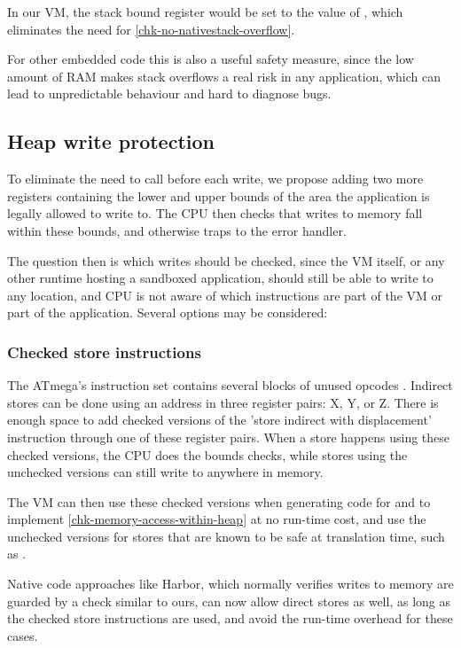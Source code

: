 In our VM, the stack bound register would be set to the value of , which eliminates the need for \ref{chk-no-nativestack-overflow}.

For other embedded code this is also a useful safety measure, since the low amount of RAM makes stack overflows a real risk in any application, which can lead to unpredictable behaviour and hard to diagnose bugs.

\subsection{Heap write protection}
To eliminate the need to call  before each write, we propose adding two more registers containing the lower and upper bounds of the area the application is legally allowed to write to. The CPU then checks that writes to memory fall within these bounds, and otherwise traps to the error handler.

The question then is which writes should be checked, since the VM itself, or any other runtime hosting a sandboxed application, should still be able to write to any location, and CPU is not aware of which instructions are part of the VM or part of the application. Several options may be considered:

\subsubsection{Checked store instructions}
The ATmega's instruction set contains several blocks of unused opcodes \cite{Atmel:AVRInstructionSetManual}. Indirect stores can be done using an address in three register pairs: X, Y, or Z. There is enough space to add checked versions of the 'store indirect with displacement' instruction through one of these register pairs. When a store happens using these checked versions, the CPU does the bounds checks, while stores using the unchecked versions can still write to anywhere in memory.

The VM can then use these checked versions when generating code for  and  to implement \ref{chk-memory-access-within-heap} at no run-time cost, and use the unchecked versions for stores that are known to be safe at translation time, such as .

Native code approaches like Harbor, which normally verifies writes to memory are guarded by a check similar to ours, can now allow direct stores as well, as long as the checked store instructions are used, and avoid the run-time overhead for these cases.

